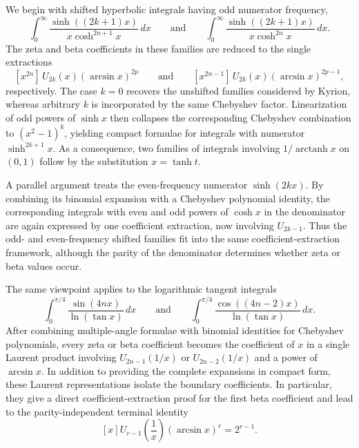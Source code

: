 \documentclass[11pt,twoside]{article}
\numberwithin{equation}{section}
\begin{document}
\vspace{0.1cm}

We begin with shifted hyperbolic integrals having odd numerator frequency,
\[
\int_{0}^{\infty}
\frac{\sinh((2k+1)x)}{x\cosh^{2n+1}x}\,dx
\qquad\text{and}\qquad
\int_{0}^{\infty}
\frac{\sinh((2k+1)x)}{x\cosh^{2n}x}\,dx.
\]
The zeta and beta coefficients in these families are reduced to the single
extractions
\[
[x^{2n}]\,U_{2k}(x)(\arcsin x)^{2p}
\qquad\text{and}\qquad
[x^{2n-1}]\,U_{2k}(x)(\arcsin x)^{2p-1},
\]
respectively.  The case \(k=0\) recovers the unshifted families considered by
Kyrion, whereas arbitrary \(k\) is incorporated by the same Chebyshev factor.
Linearization of odd powers of \(\sinh x\) then collapses the corresponding
Chebyshev combination to \((x^2-1)^k\), yielding compact formulae for
integrals with numerator \(\sinh^{2k+1}x\).  As a consequence, two families of
integrals involving \(1/\operatorname{arctanh}x\) on \((0,1)\) follow by the
substitution \(x=\tanh t\).

\vspace{0.1cm}

A parallel argument treats the even-frequency numerator \(\sinh(2kx)\).  By
combining its binomial expansion with a Chebyshev polynomial identity, the
corresponding integrals with even and odd powers of \(\cosh x\) in the
denominator are again expressed by one coefficient extraction, now involving
\(U_{2k-1}\).  Thus the odd- and even-frequency shifted families fit into the
same coefficient-extraction framework, although the parity of the denominator
determines whether zeta or beta values occur.

\vspace{0.1cm}

The same viewpoint applies to the logarithmic tangent integrals
\[
\int_0^{\pi/4}\frac{\sin(4nx)}{\ln(\tan x)}\,dx
\qquad\text{and}\qquad
\int_0^{\pi/4}\frac{\cos((4n-2)x)}{\ln(\tan x)}\,dx.
\]
After combining multiple-angle formulae with binomial identities for
Chebyshev polynomials, every zeta or beta coefficient becomes the coefficient
of \(x\) in a single Laurent product involving
\(U_{2n-1}(1/x)\) or \(U_{2n-2}(1/x)\) and a power of \(\arcsin x\).  In
addition to providing the complete expansions in compact form, these Laurent
representations isolate the boundary coefficients.  In particular, they give
a direct coefficient-extraction proof for the first beta coefficient and lead
to the parity-independent terminal identity
\[
[x]U_{r-1}\!\left(\frac1x\right)(\arcsin x)^r=2^{r-1}.
\]
\end{document}
